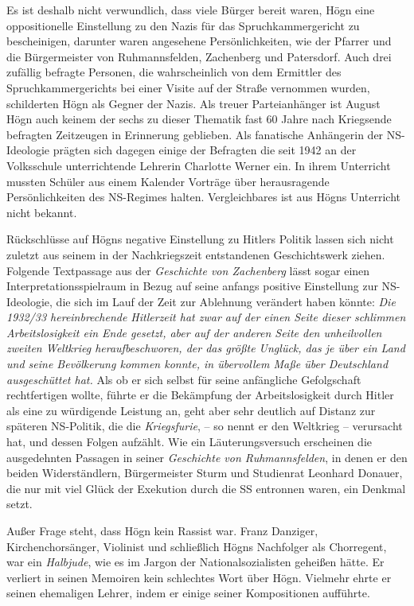 \documentclass{book}
\begin{document}
Es ist deshalb nicht verwundlich, dass viele Bürger bereit waren, Högn
eine oppositionelle Einstellung zu den Nazis für das
Spruchkammergericht zu bescheinigen, darunter waren angesehene
Persönlichkeiten, wie der Pfarrer und die Bürgermeister von
Ruhmannsfelden, Zachenberg und Patersdorf. Auch drei zufällig befragte
Personen, die wahrscheinlich von dem Ermittler des Spruchkammergerichts
bei einer Visite auf der Straße vernommen wurden, schilderten Högn
als Gegner der Nazis. Als treuer Parteianhänger ist August Högn auch
keinem der sechs zu dieser Thematik fast 60 Jahre nach Kriegsende
befragten Zeitzeugen in Erinnerung geblieben. Als fanatische
Anhängerin der NS-Ideologie prägten sich dagegen einige der Befragten
die seit 1942 an der Volksschule unterrichtende Lehrerin Charlotte
Werner ein. In ihrem Unterricht mussten Schüler aus einem Kalender
Vorträge über herausragende Persönlichkeiten des NS-Regimes halten.
Vergleichbares ist aus Högns Unterricht nicht bekannt.

Rückschlüsse auf Högns negative Einstellung zu Hitlers Politik lassen
sich nicht zuletzt aus seinem in der Nachkriegszeit entstandenen
Geschichtswerk ziehen. Folgende Textpassage aus der \textit{Geschichte
von Zachenberg} lässt sogar einen Interpretationsspielraum in Bezug auf
seine anfangs positive Einstellung zur NS-Ideologie, die sich im Lauf
der Zeit zur Ablehnung verändert haben könnte: \textit{Die 1932/33
hereinbrechende Hitlerzeit hat zwar auf der einen Seite dieser
schlimmen Arbeitslosigkeit ein Ende gesetzt, aber auf der anderen Seite
den unheilvollen zweiten Weltkrieg heraufbeschworen, der das größte
Unglück, das je über ein Land und seine Bevölkerung kommen konnte, in
übervollem Maße über Deutschland ausgeschüttet hat.} Als ob er sich
selbst für seine anfängliche Gefolgschaft rechtfertigen wollte, führte
er die Bekämpfung der Arbeitslosigkeit durch Hitler als eine zu
würdigende Leistung an, geht aber sehr deutlich auf Distanz zur
späteren NS-Politik, die die \textit{Kriegsfurie}, – so nennt er den
Weltkrieg – verursacht hat, und dessen Folgen aufzählt. Wie ein
Läuterungsversuch erscheinen die ausgedehnten Passagen in seiner
\textit{Geschichte von Ruhmannsfelden}, in denen er den beiden
Widerständlern, Bürgermeister Sturm und Studienrat Leonhard Donauer,
die nur mit viel Glück der Exekution durch die SS entronnen waren, ein
Denkmal setzt.

Außer Frage steht, dass Högn kein Rassist war. Franz Danziger,
Kirchenchorsänger, Violinist und schließlich Högns Nachfolger als
Chorregent, war ein \textit{Halbjude}, wie es im Jargon der
Nationalsozialisten geheißen hätte. Er verliert in seinen Memoiren
kein schlechtes Wort über Högn. Vielmehr ehrte er seinen ehemaligen
Lehrer, indem er einige seiner Kompositionen aufführte.
\end{document}
